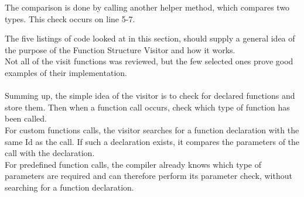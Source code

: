 The comparison is done by calling another helper method, which compares two types. This check occurs on line 5-7.

\noindent\newline
The five listings of code looked at in this section, should supply a general idea of the purpose of the Function Structure Visitor and how it works.\\
Not all of the visit functions was reviewed, but the few selected ones prove good examples of their implementation.
\\\\
Summing up, the simple idea of the visitor is to check for declared functions and store them. Then when a function call occurs, check which type of function has been called.\\
For custom functions calls, the visitor searches for a function declaration with the same Id as the call. If such a declaration exists, it compares the parameters of the call with the declaration.\\
For predefined function calls, the compiler already knows which type of parameters are required and can therefore perform its parameter check, without searching for a function declaration.